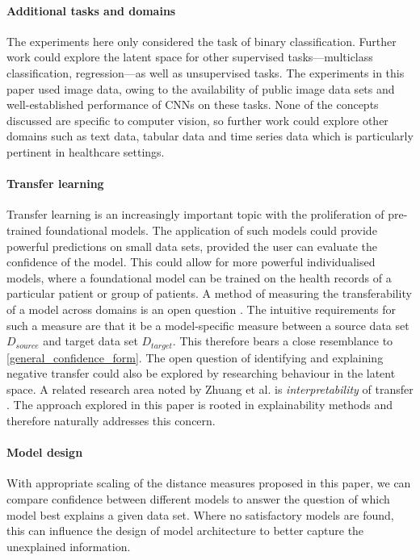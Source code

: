 \documentclass{article}
\begin{document}
\paragraph{Additional tasks and domains}
The experiments here only considered the task of binary classification. Further work could explore the latent space for other supervised tasks---multiclass classification, regression---as well as unsupervised tasks.
The experiments in this paper used image data, owing to the availability of public image data sets and well-established performance of CNNs on these tasks. None of the concepts discussed are specific to computer vision, so further work could explore other domains such as text data, tabular data and time series data which is particularly pertinent in healthcare settings.

\paragraph{Transfer learning} \label{sec:transfer learning}
Transfer learning is an increasingly important topic with the proliferation of pre-trained foundational models.
The application of such models could provide powerful predictions on small data sets, provided the user can evaluate the confidence of the model. This could allow for more powerful individualised models, where a foundational model can be trained on the health records of a particular patient or group of patients.
A method of measuring the transferability of a model across domains is an open question \cite{pan_survey_2010} \cite{zhuang_comprehensive_2021}. The intuitive requirements for such a measure are that it be a model-specific measure between  a source data set $D_{source}$ and target data set $D_{target}$. This therefore bears a close resemblance to \ref{general_confidence_form}.
The open question of identifying and explaining negative transfer could also be explored by researching behaviour in the latent space.
A related research area noted by Zhuang et al. is \emph{interpretability} of transfer \cite{zhuang_comprehensive_2021}. The approach explored in this paper is rooted in explainability methods and therefore naturally addresses this concern.

\paragraph{Model design}
With appropriate scaling of the distance measures proposed in this paper, we can compare confidence between different models to answer the question of which model best explains a given data set. Where no satisfactory models are found, this can influence the design of model architecture to better capture the unexplained information.
\end{document}
